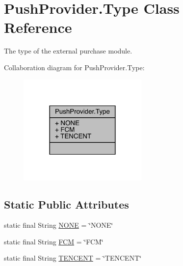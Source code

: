 \hypertarget{classcom_1_1toast_1_1android_1_1gamebase_1_1base_1_1push_1_1_push_provider_1_1_type}{}\section{Push\+Provider.\+Type Class Reference}
\label{classcom_1_1toast_1_1android_1_1gamebase_1_1base_1_1push_1_1_push_provider_1_1_type}


The type of the external purchase module.  




Collaboration diagram for Push\+Provider.\+Type\+:
\nopagebreak
\begin{figure}[H]
\begin{center}
\leavevmode
\includegraphics[width=180pt]{classcom_1_1toast_1_1android_1_1gamebase_1_1base_1_1push_1_1_push_provider_1_1_type__coll__graph}
\end{center}
\end{figure}
\subsection*{Static Public Attributes}
\begin{DoxyCompactItemize}
\item 
static final String \hyperlink{classcom_1_1toast_1_1android_1_1gamebase_1_1base_1_1push_1_1_push_provider_1_1_type_aca69a8e523ec6acc3ed4a57492b9c73f}{N\+O\+NE} = \char`\"{}N\+O\+NE\char`\"{}
\item 
static final String \hyperlink{classcom_1_1toast_1_1android_1_1gamebase_1_1base_1_1push_1_1_push_provider_1_1_type_a5cd93195d948f219ab0a681f052b7bae}{F\+CM} = \char`\"{}F\+CM\char`\"{}
\item 
static final String \hyperlink{classcom_1_1toast_1_1android_1_1gamebase_1_1base_1_1push_1_1_push_provider_1_1_type_af9ffba31e0b2f5ee0ab7199c6b4c3c16}{T\+E\+N\+C\+E\+NT} = \char`\"{}T\+E\+N\+C\+E\+NT\char`\"{}
\end{DoxyCompactItemize}


